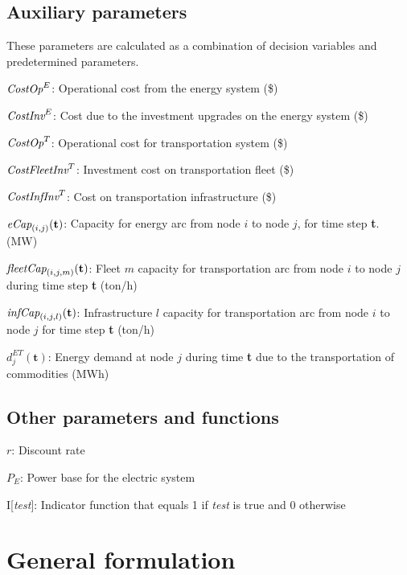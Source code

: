 \documentclass{article}
\begin{document}
\subsection{Auxiliary parameters}

These parameters are calculated as a combination of decision variables and predetermined parameters.

\begin{description}
\item $\emph{CostOp}^E$: Operational cost from the energy system (\$)
\item $\emph{CostInv}^E$: Cost due to the investment upgrades on the energy system (\$)
\item $\emph{CostOp}^T$: Operational cost for transportation system (\$)
\item $\emph{CostFleetInv}^T$: Investment cost on transportation fleet (\$)
\item $\emph{CostInfInv}^T$: Cost on transportation infrastructure (\$)
\item $\emph{eCap}_{(i,j)}(\textbf{t})$: Capacity for energy arc from node $i$ to node $j$, for time step \textbf{t}. (MW)
\item $\emph{fleetCap}_{(i,j,m)}(\textbf{t})$: Fleet $m$ capacity for transportation arc from node $i$ to node $j$ during time step \textbf{t} (ton/h)
\item $\emph{infCap}_{(i,j,l)}(\textbf{t})$: Infrastructure $l$ capacity for transportation arc from node $i$ to node $j$ for time step \textbf{t} (ton/h)
\item $d^{ET}_j(\textbf{t})$: Energy demand at node $j$ during time \textbf{t} due to the transportation of commodities (MWh)
\end{description}


\subsection{Other parameters and functions}

\begin{description}
\item $r$: Discount rate
\item $P_E$: Power base for the electric system
\item I[\emph{test}]: Indicator function that equals 1 if \emph{test} is true and 0 otherwise
\end{description}


\section{General formulation}
\end{document}
